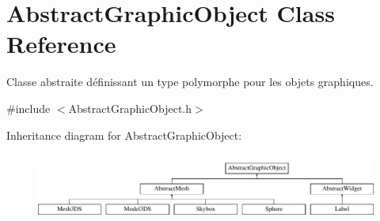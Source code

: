 \hypertarget{classAbstractGraphicObject}{\section{Abstract\-Graphic\-Object Class Reference}
\label{classAbstractGraphicObject}
}


Classe abstraite définissant un type polymorphe pour les objets graphiques.  




{\ttfamily \#include $<$Abstract\-Graphic\-Object.\-h$>$}

Inheritance diagram for Abstract\-Graphic\-Object\-:\begin{figure}[H]
\begin{center}
\leavevmode
\includegraphics[height=2.255033cm]{classAbstractGraphicObject}
\end{center}
\end{figure}
